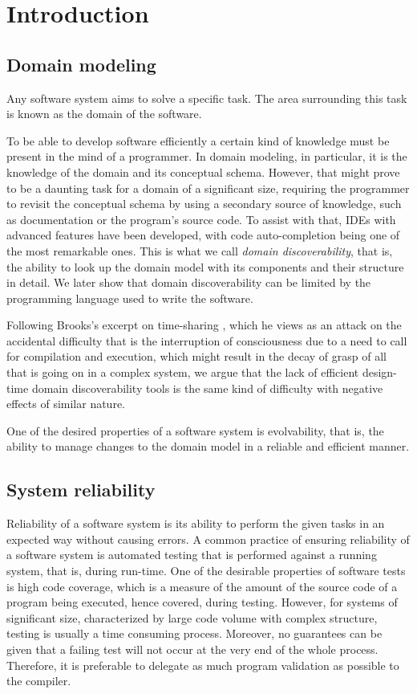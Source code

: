 \chapter{Introduction}

\section{Domain modeling}
Any software system aims to solve a specific task. The area surrounding this task is known as the domain of the software.

\n

To be able to develop software efficiently a certain kind of knowledge must be present in the mind of a programmer. In domain modeling, in particular, it is the knowledge of the domain and its conceptual schema. However, that might prove to be a daunting task for a domain of a significant size, requiring the programmer to revisit the conceptual schema by using a secondary source of knowledge, such as documentation or the program’s source code. To assist with that, IDEs with advanced features have been developed, with code auto-completion being one of the most remarkable ones. This is what we call \textit{domain discoverability}, that is, the ability to look up the domain model with its components and their structure in detail. We later show that domain discoverability can be limited by the programming language used to write the software.

\n

Following Brooks’s excerpt on time-sharing \cite{brooks}, which he views as an attack on the accidental difficulty that is the interruption of consciousness due to a need to call for compilation and execution, which might result in the decay of grasp of all that is going on in a complex system, we argue that the lack of efficient design-time domain discoverability tools is the same kind of difficulty with negative effects of similar nature.

\n

One of the desired properties of a software system is evolvability, that is, the ability to manage changes to the domain model in a reliable and efficient manner.

\section{System reliability}

Reliability of a software system is its ability to perform the given tasks in an expected way without causing errors. A common practice of ensuring reliability of a software system is automated testing that is performed against a running system, that is, during run-time. One of the desirable properties of software tests is high code coverage, which is a measure of the amount of the source code of a program being executed, hence covered, during testing. However, for systems of significant size, characterized by large code volume with complex structure, testing is usually a time consuming process. Moreover, no guarantees can be given that a failing test will not occur at the very end of the whole process. Therefore, it is preferable to delegate as much program validation as possible to the compiler.

